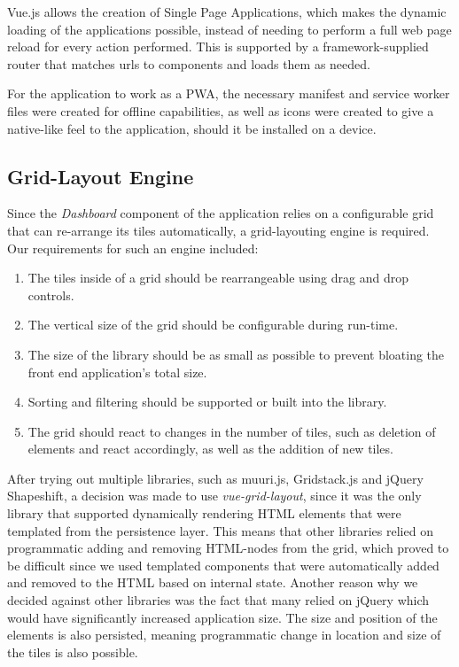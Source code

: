  Vue.js allows the creation of Single Page Applications, which makes the dynamic loading of the applications possible, instead of needing to perform a full web page reload for every action performed. This is supported by a framework-supplied router that matches urls to components and loads them as needed.
 
 For the application to work as a PWA, the necessary manifest and service worker files were created for offline capabilities, as well as icons were created to give a native-like feel to the application, should it be installed on a device.
 
 \subsection{Grid-Layout Engine}
 Since the \emph{Dashboard} component of the application relies on a configurable grid that can re-arrange its tiles automatically, a grid-layouting engine is required. Our requirements for such an engine included:
 \begin{enumerate}
    \item The tiles inside of a grid should be rearrangeable using drag and drop controls.
    \item The vertical size of the grid should be configurable during run-time.
    \item The size of the library should be as small as possible to prevent bloating the front end application's total size.
    \item Sorting and filtering should be supported or built into the library.
    \item The grid should react to changes in the number of tiles, such as deletion of elements and react accordingly, as well as the addition of new tiles.
\end{enumerate}{}
After trying out multiple libraries, such as muuri.js, Gridstack.js and jQuery Shapeshift, a decision was made to use \emph{vue-grid-layout}, since it was the only library that supported dynamically rendering HTML elements that were templated from the persistence layer. This means that other libraries relied on programmatic adding and removing HTML-nodes from the grid, which proved to be difficult since we used templated components that were automatically added and removed to the HTML based on internal state. Another reason why we decided against other libraries was the fact that many relied on jQuery which would have significantly increased application size.
The size and position of the elements is also persisted, meaning programmatic change in location and size of the tiles is also possible.
